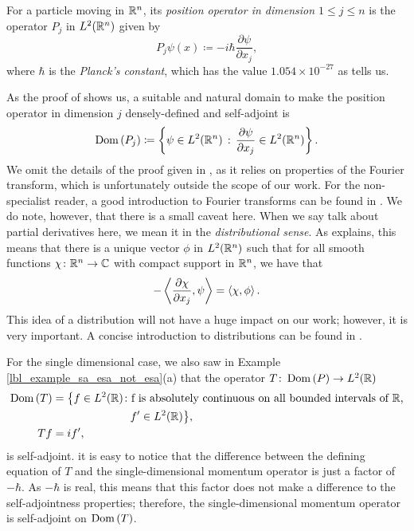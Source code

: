 \begin{definition}
  For a particle moving in $\mathbb{R}^n$, its {\emph{position operator in dimension $1 \leq j \leq n$}} is the operator $P_j$ in $L^2(\mathbb{R}^n)$ given by
  \begin{equation*}
    P_j \psi({x}) \coloneqq -i \hbar \frac{\partial \psi}{\partial x_j},
  \end{equation*}
  where $\hbar$ is the {\emph{Planck's constant}}, which has the value $1.054 \times 10^{-27}$ as {\cite[p.5]{Hall2013}} tells us.
\end{definition}
\begin{remark}\label{lbl_standard_domain_momentum_sa}
  As the proof of {\cite[Proposition 9.32]{Hall2013}} shows us, a suitable and natural domain to make the position operator in dimension $j$ densely-defined and self-adjoint is
  \begin{equation*}
    \operatorname{Dom}\left(P_j\right) \coloneqq \left\{\psi \in L^2(\mathbb{R}^n) \, : \, \frac{\partial \psi}{\partial x_j} \in L^2(\mathbb{R}^n)\right\}.
  \end{equation*}
  We omit the details of the proof given in {\cite[Proposition 9.32]{Hall2013}}, as it relies on properties of the Fourier transform, which is unfortunately outside the scope of our work. For the non-specialist reader, a good introduction to Fourier transforms can be found in {\cite[Chapter 7.1]{teschl}}. We do note, however, that there is a small caveat here. When we say talk about partial derivatives here, we mean it in the {\emph{distributional sense}}. As {\cite[Proposition 9.32]{Hall2013}} explains, this means that there is a unique vector $\phi$ in $L^2(\mathbb{R}^n)$ such that for all smooth functions $\chi \colon \mathbb{R}^n \to \mathbb{C}$ with compact support in $\mathbb{R}^n$, we have that
  \begin{equation*}
    -\left\langle \frac{\partial \chi}{\partial x_j}, \psi\right\rangle
    =
    \left\langle \chi, \phi\right\rangle.
  \end{equation*}
  This idea of a distribution will not have a huge impact on our work; however, it is very important. A concise introduction to distributions can be found in {\cite[Chapter 2.1]{showalter}}.

  \medskip

  For the single dimensional case, we also saw in Example \eqref{lbl_example_sa_esa_not_esa}(a) that the operator $T \colon \operatorname{Dom}\left(P\right) \to L^2(\mathbb{R})$
  \begin{align*}
    \operatorname{Dom}\left(T\right)
      &= \big\{f \in L^2(\mathbb{R}) \colon \text{f is absolutely continuous on all bounded intervals of $\mathbb{R}$,}\\&\qquad\qquad\qquad\quad \text{$f' \in L^2(\mathbb{R})$}\big\}, \\
      T f &= i f',
  \end{align*}
  is self-adjoint. it is easy to notice that the difference between the defining equation of $T$ and the single-dimensional momentum operator is just a factor of $-\hbar$. As $-\hbar$ is real, this means that this factor does not make a difference to the self-adjointness properties; therefore, the single-dimensional momentum operator is self-adjoint on $\operatorname{Dom}\left(T\right)$.
\end{remark}

